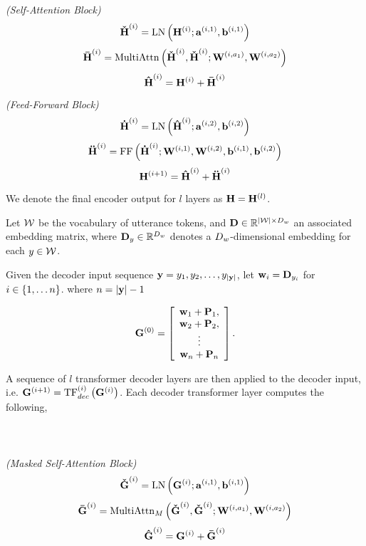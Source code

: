 \noindent \textit{(Self-Attention Block)}\\
\[\boldsymbol{\check{\mathbf{H}}}^{(i)} = \operatorname{LN}\left(\mathbf{H}^{(i)}; \mathbf{a}^{(i,1)}, \mathbf{b}^{(i,1)}\right)\]
\[\boldsymbol{\bar{\mathbf{H}}}^{(i)} = \operatorname{MultiAttn}\left(\boldsymbol{\check{\mathbf{H}}}^{(i)}, \boldsymbol{\check{\mathbf{H}}}^{(i)}; \mathbf{W}^{(i,a_1)},  \mathbf{W}^{(i,a_2)}\right)\]
\[\boldsymbol{\hat{\mathbf{H}}}^{(i)} = \mathbf{H}^{(i)} + \boldsymbol{\bar{\mathbf{H}}}^{(i)}\]

\noindent \textit{(Feed-Forward Block)}\\
\[\boldsymbol{\dot{\mathbf{H}}}^{(i)} = \operatorname{LN}\left(\boldsymbol{\hat{\mathbf{H}}}^{(i)}; \mathbf{a}^{(i,2)}, \mathbf{b}^{(i,2)}\right)\]
\[\boldsymbol{\ddot{\mathbf{H}}}^{(i)} = \operatorname{FF}\left(\boldsymbol{\dot{\mathbf{H}}}^{(i)};\mathbf{W}^{(i,1)},\mathbf{W}^{(i,2)},\mathbf{b}^{(i,1)},\mathbf{b}^{(i,2)}\right)\]
\[ \mathbf{H}^{(i+1)} = \boldsymbol{\hat{\mathbf{H}}}^{(i)} + \boldsymbol{\ddot{\mathbf{H}}}^{(i)} \]


We denote the final encoder output for $l$ layers as $\mathbf{H} = \mathbf{H}^{(l)}$.  

Let $\mathcal{W}$ be the vocabulary of utterance tokens, and 
$\mathbf{D} \in \mathbb{R}^{{\lvert \mathcal{W} \rvert} \times {D_w}}$
an associated embedding matrix, where
$\mathbf{D}_{y} \in \mathbb{R}^{{D_w}}$ denotes a  ${D_w}$-dimensional embedding for
each $y \in \mathcal{W}$.

Given the decoder input sequence $\mathbf{y} = y_1, y_2, \ldots, 
y_{{\lvert \mathbf{y} \rvert}}$, 
let $\mathbf{w}_i = \mathbf{D}_{y_i}$ for $i \in \{1, \ldots n\}$.
where $n = {\lvert \mathbf{y} \rvert} - 1$

\[\mathbf{G}^{(0)} = \left[\begin{array}{c} 
            \mathbf{w}_1 + \mathbf{P}_1,\\
            \mathbf{w}_2 + \mathbf{P}_2,\\
            \vdots \\
        \mathbf{w}_n + \mathbf{P}_n
    \end{array}
                        \right]. \]


A sequence of $l$ transformer decoder layers are then applied to the decoder
 input, i.e. $\mathbf{G}^{(i+1)} = \operatorname{TF}^{(i)}_{dec}\left(\mathbf{G}^{(i)}\right)$.
Each decoder transformer layer computes the following, \\

~\\~\\ ~\\

\noindent \textit{(Masked Self-Attention Block)}\\
\[\boldsymbol{\check{\mathbf{G}}}^{(i)} = \operatorname{LN}\left(\mathbf{G}^{(i)}; \mathbf{a}^{(i,1)}, \mathbf{b}^{(i,1)}\right)\]
\[\boldsymbol{\bar{\mathbf{G}}}^{(i)} = \operatorname{MultiAttn}_M\left(\boldsymbol{\check{\mathbf{G}}}^{(i)}, \boldsymbol{\check{\mathbf{G}}}^{(i)}; \mathbf{W}^{(i,a_1)}, \mathbf{W}^{(i,a_2)} \right)\]
\[\boldsymbol{\hat{\mathbf{G}}}^{(i)} = \mathbf{G}^{(i)} + \boldsymbol{\bar{\mathbf{G}}}^{(i)}\]

